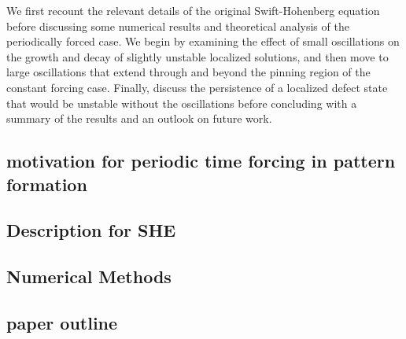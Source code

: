 \documentclass[../main/TimeForcingSHE.tex]{subfiles}
\begin{document}
We first recount the relevant details of the original Swift-Hohenberg equation before discussing some numerical results and theoretical analysis of the periodically forced case.   We begin by examining the  effect of small oscillations on the growth and decay of slightly  unstable localized solutions, and then move to large oscillations that extend through and beyond the pinning region of the constant forcing case.  Finally, discuss the persistence of a localized defect state that would be unstable without the oscillations before concluding with a summary of the results and an outlook on future work.

\subsection{motivation for periodic time forcing in pattern formation}
\subsection{Description for SHE}
\subsection{Numerical Methods}
\subsection{paper outline}



\end{document}
